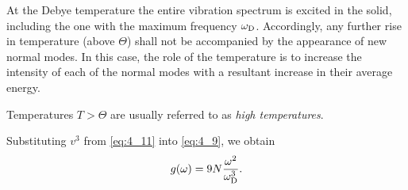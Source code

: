 \begin{table}[!b]
	\renewcommand{\arraystretch}{1.2}
	\caption{}
	\vspace{-0.6cm}
	\label{table:4_1}
	\begin{center}\end{center}
\end{table}

At the Debye temperature the entire vibration spectrum is excited in the solid, including the one with the maximum frequency $\omega_{\text{D}}$. Accordingly, any further rise in temperature (above $\Theta$) shall not be accompanied by the appearance of new normal modes. In this case, the role of the temperature is to increase the intensity of each of the normal modes with a resultant increase in their average energy.

Temperatures $T>\Theta$ are usually referred to as \textit{high temperatures}.

Substituting $v^3$ from \eqref{eq:4_11} into \eqref{eq:4_9}, we obtain
\begin{equation}\label{eq:4_14}
    g(\omega) = 9 N \frac{\omega^2}{\omega_{\text{D}}^3}.
\end{equation}

